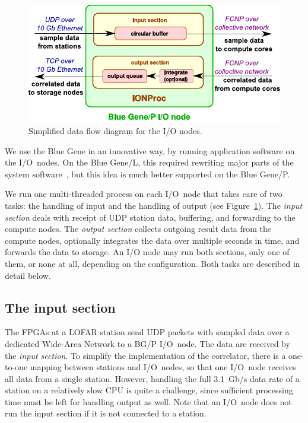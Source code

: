 \documentclass{sig-alternate}
\begin{document}
\begin{figure}[t]
\includegraphics[width=\columnwidth]{ION-processing.pdf}
\caption{Simplified data flow diagram for the I/O nodes.}
\label{fig:ion-processing}
\end{figure}

We use the Blue Gene in an innovative way, by running application software
on the I/O~nodes.
On the Blue Gene/L, this required rewriting major parts of the system
software~\cite{Iskra:08}, but this idea is much better supported on the
Blue Gene/P.

We run one multi-threaded process on each I/O~node that takes care of two
tasks: the handling of input and the handling of output (see
Figure~\ref{fig:ion-processing}).
The \emph{input section\/} deals with receipt of UDP station data, buffering,
and forwarding to the compute nodes.
The \emph{output section\/} collects outgoing result data from the compute
nodes, optionally integrates the data over multiple seconds in time, and
forwards the data to storage.
An I/O node may run both sections, only one of them, or none at all, depending
on the configuration.
Both tasks are described in detail below.


\subsection{The input section}
\label{sec:input-handling}

The FPGAs at a LOFAR station send UDP packets with sampled data over a
dedicated Wide-Area Network to a BG/P I/O~node.
The data are received by the \emph{input section}.
To simplify the implementation of the correlator, there is a one-to-one
mapping between stations and I/O~nodes, so that one I/O~node receives all
data from a single station.
However, handling the full 3.1~Gb/s data rate of a station on a relatively
slow CPU is quite a challenge, since sufficient processing time must be left
for handling output as well.
Note that an I/O~node does not run the input section if it is not
connected to a station.
\end{document}
